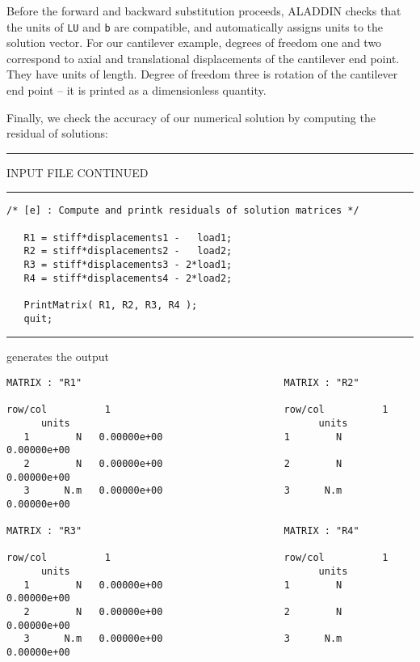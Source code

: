 \vspace{0.15 in}\noindent
Before the forward and backward substitution proceeds,
ALADDIN checks that the units of {\tt LU} and {\tt b} are compatible,
and automatically assigns units to the solution vector.
For our cantilever example, degrees of freedom one and two correspond
to axial and translational displacements of the cantilever end point.
They have units of length. Degree of freedom three is rotation of the
cantilever end point -- it is printed as a dimensionless quantity.

\vspace{0.15 in}
\noindent\hspace{0.50 in}
Finally, we check the accuracy of our numerical solution by
computing the residual of solutions:

\vspace{0.15 in}
\begin{footnotesize}
\noindent
{\rule{2.2 in}{0.035 in} INPUT FILE CONTINUED \rule{2.2 in}{0.035 in} }
\begin{verbatim}
/* [e] : Compute and printk residuals of solution matrices */

   R1 = stiff*displacements1 -   load1;
   R2 = stiff*displacements2 -   load2;
   R3 = stiff*displacements3 - 2*load1;
   R4 = stiff*displacements4 - 2*load2;

   PrintMatrix( R1, R2, R3, R4 );
   quit;
\end{verbatim}
\rule{6.25 in}{0.035 in}
\end{footnotesize}

\vspace{0.15 in}\noindent
generates the output

\begin{footnotesize}
\begin{verbatim}
MATRIX : "R1"                                   MATRIX : "R2"

row/col          1                              row/col          1          
      units                                           units             
   1        N   0.00000e+00                     1        N   0.00000e+00
   2        N   0.00000e+00                     2        N   0.00000e+00
   3      N.m   0.00000e+00                     3      N.m   0.00000e+00

MATRIX : "R3"                                   MATRIX : "R4"

row/col          1                              row/col          1          
      units                                           units             
   1        N   0.00000e+00                     1        N   0.00000e+00
   2        N   0.00000e+00                     2        N   0.00000e+00
   3      N.m   0.00000e+00                     3      N.m   0.00000e+00
\end{verbatim}
\end{footnotesize}

